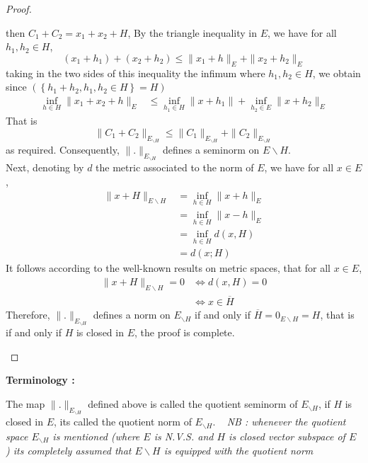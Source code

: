 \begin{proof}
\begin{enumerate}
	then $C_1 + C_2 = 
	x_1 + x_2 + H$, By the triangle inequality in $E $, we have
	for all $h_1, h_2 \in  H $, 
	\[
		(x_1 + h_1)  + (x_2 + h_2)   
		\leq \| x_1 + h \|  _{E } + 
		\| x_2 + h_2 \|  _{E}
	\] 
	taking in the two sides of this inequality the infimum where 
	$h_1, h_2 \in H $, we obtain since $(\left\{ h_1 + h_2, 
	h_1,h_2 \in H\right\} = H)$
	\begin{align*}
	\inf_{h \in H}  
	\| x_1 + x_2 + h \| _{E} & \leq 
	\inf_{h_1 \in  H}  
	\| x + h_1 \|  + \inf_{h_2 \in  E}  \| x + h_2 \| _{E} 
	\end{align*}
	That is 
	\[
		\| C_1 + C_2 \|  _{E _{ \backslash H}} 
		 \leq 
		\| C_1  \| _{E _{ \backslash H}} + 
		\| C_2 \| _{ E_{ \backslash H}}
	\]
	as required. Consequently, 
	$\| . \| _{E _{ \backslash H}} $  defines a seminorm 
	on $E \backslash H$. \\
	Next, denoting by $d $ the metric associated to the norm
	of $E $, we have for all $x \in  E $, 
	\begin{align*}
		\| x + H \|  _{E \backslash H} 
		&= \inf_{h \in  H}   
		\| x+h \| _{E} \\
		&= \inf_{h \in  H}  
		\| x - h \| _{E} \\
		&= \inf_{h \in H}  
		d(x,H)  \\
		&= d(x;H) 
	\end{align*}
	It follows according to the well-known results on metric spaces, 
	that for all $x \in  E $, 
	\begin{align*}
		\| x + H \| _{E \backslash H} = 0 & 
		\iff 
		d(x,H)  = 0  
	\\
						  & \iff 
			x \in  \overline{H}
	\end{align*}
	Therefore, $\| . \| _{E _{ \backslash H}} $  
	defines a norm on $E_{ \backslash H}$  if 
	and only if $\overline{H} = 0_{E \backslash H} = H $, that 
	is if and only if $H $ is closed in $E $, the proof is complete.
\end{enumerate}
\end{proof}
\begin{center}
	\textbf{Terminology : }
\end{center}
The map $ \| . \| _{E _{ \backslash H}} $  defined above is 
called the quotient seminorm of $E _{ \backslash H} $, if $H $ 
is closed in $E $, its called the quotient norm of $E _{ \backslash H} $.
\divider
\lefthand ~ \it NB : \normalfont whenever the quotient 
space $E _{ \backslash H} $  is mentioned (where $E $ is N.V.S. and $H $ is 
closed vector subspace of $E $ ) its completely assumed that 
$E \backslash H $  is equipped with the quotient norm 
